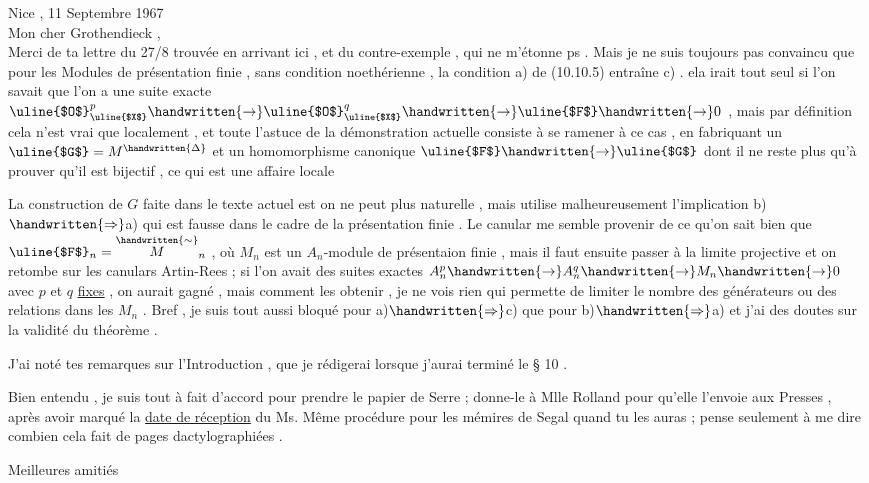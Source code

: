Nice , 11 Septembre 1967\\

Mon cher Grothendieck ,\\

Merci de ta lettre du 27/8 trouvée en arrivant ici , et du contre-exemple , qui ne m'étonne ps . Mais je ne suis toujours pas convaincu que pour les Modules de présentation finie , sans condition noethérienne , la condition a) de (10.10.5) entraîne c) . ela irait tout seul si l'on savait que l'on a une suite exacte $\text{\uline{$O$}}_{\text{\uline{$X$}}}^{p}\handwritten{\to}\text{\uline{$O$}}_{\text{\uline{$X$}}}^{q}\handwritten{\to}\text{\uline{$F$}}\handwritten{\to}0$ , mais par définition cela  n'est vrai que localement , et toute l'astuce de la démonstration actuelle consiste à se ramener à ce cas , en fabriquant un $\text{\uline{$G$}}=M^{\handwritten{\Delta}}$ et un homomorphisme canonique $\text{\uline{$F$}}\handwritten{\to}\text{\uline{$G$}}$ dont il ne reste plus qu'à prouver qu'il est bijectif , ce qui est une affaire locale

La construction de \uline{$G$} faite dans le texte actuel est on ne peut plus naturelle , mais utilise malheureusement l'implication b)$\handwritten{\Rightarrow}$a) qui est fausse dans le cadre de la présentation finie . Le canular me semble provenir de ce qu'on sait bien que $\text{\uline{$F$}}_n=\overset{\handwritten{\sim}}{M}_n$ , où $M_n$ est un $A_n$-module de présentaion finie , mais il faut ensuite passer à la limite projective \reversemarginpar{}\normalmarginpar et on retombe sur les canulars Artin-Rees ; si l'on avait des suites exactes $A_n^p\handwritten{\to}A_n^q\handwritten{\to}M_n\handwritten{\to}0$ avec $p$ et $q$ \uline{fixes} , on aurait gagné , mais comment les obtenir , je ne vois rien qui permette de limiter le nombre des générateurs ou des relations dans les $M_n$ . Bref , je suis tout aussi bloqué pour  a)$\handwritten{\Rightarrow}$c) que pour b)$\handwritten{\Rightarrow}$a) et j'ai des doutes sur la validité du théorème .

J'ai noté tes remarques sur l'Introduction , que je rédigerai lorsque j'aurai terminé le § 10 .

Bien entendu , je suis tout à fait d'accord pour prendre le papier de Serre ; donne-le à Mlle Rolland pour qu'elle l'envoie aux Presses , après avoir marqué la \uline{date de réception} du Ms. Même procédure \reversemarginpar{}\normalmarginpar pour les mémires de Segal quand tu les auras ; pense seulement à me dire combien cela fait de pages dactylographiées .

Meilleures amitiés\\
\\
